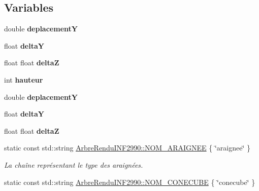 \subsection*{Variables}
\begin{DoxyCompactItemize}
\item 
double {\bfseries deplacement\+Y}
\item 
\hypertarget{group__inf2990_ga44ef3d47a1eab85511f25ca8cdf94a8a}{}float {\bfseries delta\+Y}\label{group__inf2990_ga44ef3d47a1eab85511f25ca8cdf94a8a}

\item 
float float {\bfseries delta\+Z}
\item 
\hypertarget{group__inf2990_ga5e94a2f98c16e8b6860f95c99da1c0d3}{}int {\bfseries hauteur}\label{group__inf2990_ga5e94a2f98c16e8b6860f95c99da1c0d3}

\item 
\hypertarget{group__inf2990_ga84b180f09e9802d980aa3f7cc71703da}{}double {\bfseries deplacement\+Y}\label{group__inf2990_ga84b180f09e9802d980aa3f7cc71703da}

\item 
\hypertarget{group__inf2990_ga44ef3d47a1eab85511f25ca8cdf94a8a}{}float {\bfseries delta\+Y}\label{group__inf2990_ga44ef3d47a1eab85511f25ca8cdf94a8a}

\item 
\hypertarget{group__inf2990_ga9644447719a7934b7eca34bdf6656363}{}float float {\bfseries delta\+Z}\label{group__inf2990_ga9644447719a7934b7eca34bdf6656363}

\item 
\hypertarget{group__inf2990_ga1035430c1c08b95d17f891ae89b33b80}{}static const std\+::string \hyperlink{group__inf2990_ga1035430c1c08b95d17f891ae89b33b80}{Arbre\+Rendu\+I\+N\+F2990\+::\+N\+O\+M\+\_\+\+A\+R\+A\+I\+G\+N\+E\+E} \{ \char`\"{}araignee\char`\"{} \}\label{group__inf2990_ga1035430c1c08b95d17f891ae89b33b80}

\begin{DoxyCompactList}\small\item\em La chaîne représentant le type des araignées. \end{DoxyCompactList}\item 
\hypertarget{group__inf2990_gae849656178f4dad34106f525bf37341a}{}static const std\+::string \hyperlink{group__inf2990_gae849656178f4dad34106f525bf37341a}{Arbre\+Rendu\+I\+N\+F2990\+::\+N\+O\+M\+\_\+\+C\+O\+N\+E\+C\+U\+B\+E} \{ \char`\"{}conecube\char`\"{} \}\label{group__inf2990_gae849656178f4dad34106f525bf37341a}


\end{DoxyCompactItemize}
